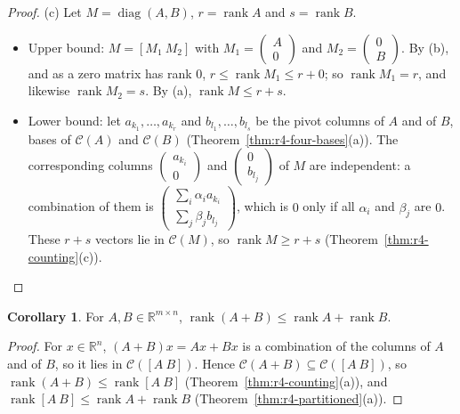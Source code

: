 \documentclass[12pt]{article}
\newcommand{\R}{\mathbb R}
\DeclareMathOperator{\diag}{diag}
\DeclareMathOperator{\rank}{rank}
\theoremstyle{definition}
\newtheorem{corollary}[theorem]{Corollary}
\begin{document}
\begin{proof}
(c) Let \(M=\diag(A,B)\), \(r=\rank A\) and \(s=\rank B\).
\begin{itemize}
\item Upper bound: \(M=[M_1\ M_2]\) with \(M_1=\left(\begin{smallmatrix}A\\0\end{smallmatrix}\right)\)
and \(M_2=\left(\begin{smallmatrix}0\\B\end{smallmatrix}\right)\). By (b), and as a zero matrix has
rank \(0\), \(r\leqslant\rank M_1\leqslant r+0\); so \(\rank M_1=r\), and likewise
\(\rank M_2=s\). By (a), \(\rank M\leqslant r+s\).
\item Lower bound: let \(a_{k_1},\dots,a_{k_r}\) and \(b_{l_1},\dots,b_{l_s}\) be the pivot columns of
\(A\) and of \(B\), bases of \(\mathcal C(A)\) and \(\mathcal C(B)\)
(Theorem~\ref{thm:r4-four-bases}(a)). The corresponding columns
\(\left(\begin{smallmatrix}a_{k_i}\\0\end{smallmatrix}\right)\) and
\(\left(\begin{smallmatrix}0\\b_{l_j}\end{smallmatrix}\right)\) of \(M\) are independent: a combination
of them is \(\left(\begin{smallmatrix}\sum_i\alpha_ia_{k_i}\\\sum_j\beta_jb_{l_j}\end{smallmatrix}\right)\),
which is \(0\) only if all \(\alpha_i\) and \(\beta_j\) are \(0\). These \(r+s\) vectors lie in
\(\mathcal C(M)\), so \(\rank M\geqslant r+s\) (Theorem~\ref{thm:r4-counting}(c)).\qedhere
\end{itemize}
\end{proof}

\begin{corollary}\label{cor:r4-rank-sum}
For \(A,B\in\R^{m\times n}\), \(\rank(A+B)\leqslant\rank A+\rank B\).
\end{corollary}
\begin{proof}
For \(x\in\R^n\), \((A+B)x=Ax+Bx\) is a combination of the columns of \(A\) and of \(B\), so it
lies in \(\mathcal C([A\ B])\). Hence \(\mathcal C(A+B)\subseteq\mathcal C([A\ B])\), so
\(\rank(A+B)\leqslant\rank[A\ B]\) (Theorem~\ref{thm:r4-counting}(a)), and
\(\rank[A\ B]\leqslant\rank A+\rank B\) (Theorem~\ref{thm:r4-partitioned}(a)).
\end{proof}
\end{document}
